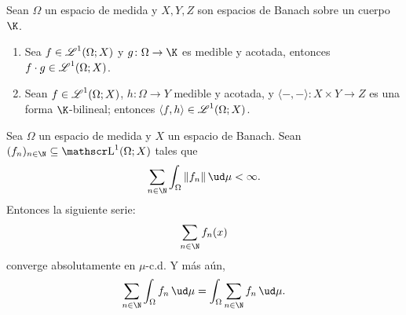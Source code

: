 \begin{cor}
	Sean $\Omega$ un espacio de medida y $X, Y, Z$ son espacios de Banach sobre un cuerpo $\K$.
	\begin{enumerate}
		\item Sea $f \in \operatorname{\mathscr{L}}^1(\Omega; X)$ y $g\colon \Omega \to \K$ es medible y acotada, entonces $f\cdot g \in \operatorname{\mathscr{L}}^1(\Omega; X)$.
		\item Sean $f \in \operatorname{\mathscr{L}}^1(\Omega; X)$, $h\colon \Omega \to Y$ medible y acotada, y $ \langle -,- \rangle \colon X\times Y \to Z$
			es una forma $\K$-bilineal; entonces $\langle f, h \rangle \in \operatorname{\mathscr{L}}^1(\Omega; X)$.
	\end{enumerate}
\end{cor}
\begin{cor}
	Sea $\Omega$ un espacio de medida y $X$ un espacio de Banach.
	Sean $(f_n)_{n\in\N} \subseteq \LL^1(\Omega; X)$ tales que
	$$ \sum_{n\in\N} \int_{\Omega} \|f_n\| \, \ud \mu < \infty. $$
	Entonces la siguiente serie:
	$$ \sum_{n\in\N} f_n(x) $$
	converge absolutamente en $\mu$-c.d. Y más aún,
	$$ \sum_{n\in\N} \int_{\Omega} f_n \, \ud \mu = \int_{\Omega} \sum_{n\in\N} f_n \, \ud \mu. $$
\end{cor}


